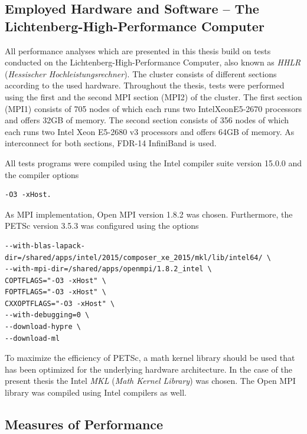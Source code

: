 \subsection{Employed Hardware and Software -- The Lichtenberg-High-Performance Computer }
\label{sec:hhlr}

All performance analyses which are presented in this thesis build on tests conducted on the Lichtenberg-High-Performance Computer, also known as \emph{HHLR} (\emph{Hessischer Hochleistungsrechner}). The cluster consists of different sections according to the used hardware. Throughout the thesis, tests were performed using the first and the second MPI section (MPI2) of the cluster. The first section (MPI1) consists of 705 nodes of which each runs two Intel\textregistered Xeon\textregistered E5-2670 processors and offers 32GB of memory. The second section consists of 356 nodes of which each runs two Intel Xeon E5-2680 v3 processors and offers 64GB of memory. As interconnect for both sections, FDR-14 InfiniBand is used.

All tests programs were compiled using the Intel compiler suite version 15.0.0 and the compiler options
\begin{lstlisting}
-O3 -xHost.
\end{lstlisting}
As MPI implementation, Open MPI version 1.8.2 was chosen. Furthermore, the PETSc version 3.5.3 was configured using the options
\begin{lstlisting}
--with-blas-lapack-dir=/shared/apps/intel/2015/composer_xe_2015/mkl/lib/intel64/ \
--with-mpi-dir=/shared/apps/openmpi/1.8.2_intel \
COPTFLAGS="-O3 -xHost" \
FOPTFLAGS="-O3 -xHost" \
CXXOPTFLAGS="-O3 -xHost" \
--with-debugging=0 \
--download-hypre \
--download-ml
\end{lstlisting}
To maximize the efficiency of PETSc, a math kernel library should be used that has been optimized for the underlying hardware architecture. In the case of the present thesis the Intel \emph{MKL} (\emph{Math Kernel Library}) was chosen. The Open MPI library was compiled using Intel compilers as well.

\subsection{Measures of Performance}

